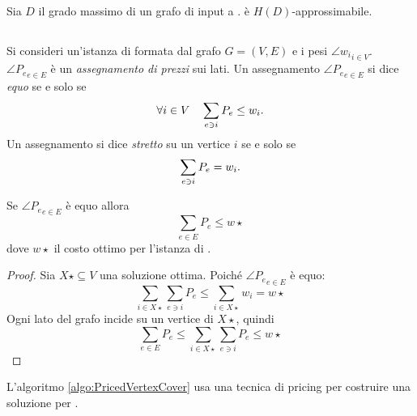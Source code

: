 \begin{theorem}
	Sia $D$ il grado massimo di un grafo di input a \VertexCover. \VertexCover è $H(D)$-approssimabile.
\end{theorem}


\subsection{\PricedVertexCover}
Si consideri un'istanza di \VertexCover formata dal grafo $G=(V,E)$ e i pesi $\angle{w_i}_{i\in V}$.
$\angle{P_e}_{e\in E}$ è un \emph{assegnamento di prezzi} sui lati.
Un assegnamento $\angle{P_e}_{e\in E}$ si dice \emph{equo} se e solo se
\begin{equation*}
	\forall i\in V\quad\sum_{e\ni i} P_e\leq w_i \text.
\end{equation*}
Un assegnamento si dice \emph{stretto} su un vertice $i$ se e solo se
\begin{equation*}
	\sum_{e\ni i} P_e = w_i \text.
\end{equation*}

\begin{lemma}\label{lem:vcov_pricing_eq_sum_p_e_w_opt}
	Se $\angle{P_e}_{e\in E}$ è equo allora
	\begin{equation*}
		\sum_{e\in E} P_e \leq w\star
	\end{equation*}
	dove $w\star$ il costo ottimo per l'istanza di \VertexCover.
\end{lemma}
\begin{proof}
	Sia $X\star\subseteq V$ una soluzione ottima. Poiché $\angle{P_e}_{e\in E}$ è equo:
	\begin{equation*}
		\sum_{i\in X\star} \sum_{e\ni i} P_e \leq \sum_{i\in X\star} w_i = w\star
	\end{equation*}
	Ogni lato del grafo incide su un vertice di $X\star$, quindi
	\begin{equation*}
		\sum_{e\in E} P_e \leq \sum_{i\in X\star} \sum_{e\ni i} P_e \leq w\star
	\end{equation*}
\end{proof}

L'algoritmo \ref{algo:PricedVertexCover} usa una tecnica di pricing per costruire una soluzione per \VertexCover.
\begin{algorithm}
	\caption{\PricedVertexCover}
	\label{algo:PricedVertexCover}
	
\end{algorithm}

